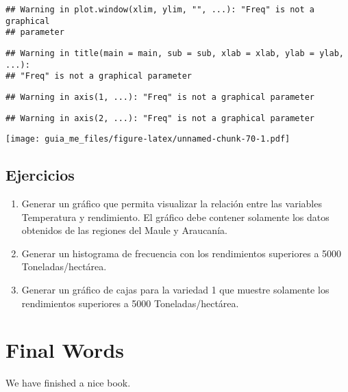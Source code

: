 \documentclass[]{book}
\providecommand{\tightlist}{%
  \setlength{\itemsep}{0pt}\setlength{\parskip}{0pt}}
\begin{document}
\begin{verbatim}
## Warning in plot.window(xlim, ylim, "", ...): "Freq" is not a graphical
## parameter
\end{verbatim}

\begin{verbatim}
## Warning in title(main = main, sub = sub, xlab = xlab, ylab = ylab, ...):
## "Freq" is not a graphical parameter
\end{verbatim}

\begin{verbatim}
## Warning in axis(1, ...): "Freq" is not a graphical parameter
\end{verbatim}

\begin{verbatim}
## Warning in axis(2, ...): "Freq" is not a graphical parameter
\end{verbatim}

\texttt{[image: guia\_me\_files/figure-latex/unnamed-chunk-70-1.pdf]}

\hypertarget{ejercicios}{%
\section{Ejercicios}\label{ejercicios}}

\begin{enumerate}
\def\labelenumi{\arabic{enumi}.}
\tightlist
\item
  Generar un gráfico que permita visualizar la relación entre las variables Temperatura y rendimiento.
  El gráfico debe contener solamente los datos obtenidos de las regiones del Maule y Araucanía.
\item
  Generar un histograma de frecuencia con los rendimientos superiores a 5000 Toneladas/hectárea.
\item
  Generar un gráfico de cajas para la variedad 1 que muestre solamente los rendimientos superiores a
  5000 Toneladas/hectárea.
\end{enumerate}

\hypertarget{final-words}{%
\chapter{Final Words}\label{final-words}}

We have finished a nice book.


\end{document}
